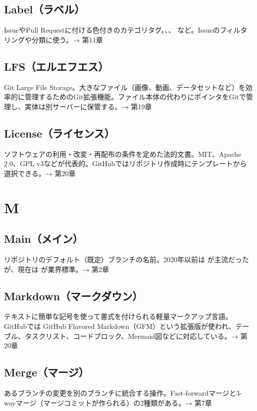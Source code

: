 \subsection*{Label（ラベル）}
IssueやPull Requestに付ける色付きのカテゴリタグ。、、 など。Issueのフィルタリングや分類に使う。→ 第11章

\subsection*{LFS（エルエフエス）}
Git Large File Storage。大きなファイル（画像、動画、データセットなど）を効率的に管理するためのGit拡張機能。ファイル本体の代わりにポインタをGitで管理し、実体は別サーバーに保管する。→ 第19章

\subsection*{License（ライセンス）}
ソフトウェアの利用・改変・再配布の条件を定めた法的文書。MIT、Apache 2.0、GPL v3などが代表的。GitHubではリポジトリ作成時にテンプレートから選択できる。→ 第20章

\section*{M}

\subsection*{Main（メイン）}
リポジトリのデフォルト（既定）ブランチの名前。2020年以前は  が主流だったが、現在は  が業界標準。→ 第2章

\subsection*{Markdown（マークダウン）}
テキストに簡単な記号を使って書式を付けられる軽量マークアップ言語。GitHubでは GitHub Flavored Markdown（GFM）という拡張版が使われ、テーブル、タスクリスト、コードブロック、Mermaid図などに対応している。→ 第20章

\subsection*{Merge（マージ）}
あるブランチの変更を別のブランチに統合する操作。Fast-forwardマージと3-wayマージ（マージコミットが作られる）の2種類がある。→ 第7章

